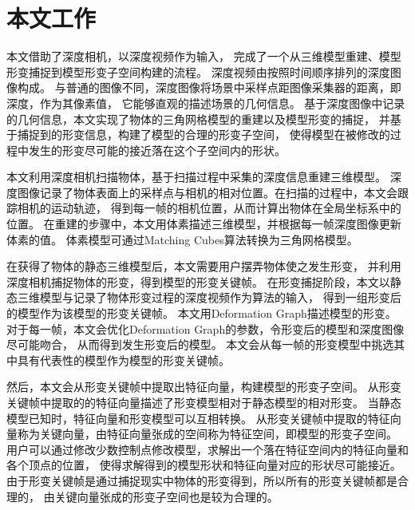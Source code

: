 
\section{本文工作}
本文借助了深度相机，以深度视频作为输入，
完成了一个从三维模型重建、模型形变捕捉到模型形变子空间构建的流程。
深度视频由按照时间顺序排列的深度图像构成。
与普通的图像不同，深度图像将场景中采样点距图像采集器的距离，即深度，作为其像素值，
它能够直观的描述场景的几何信息。
基于深度图像中记录的几何信息，本文实现了物体的三角网格模型的重建以及模型形变的捕捉，
并基于捕捉到的形变信息，构建了模型的合理的形变子空间，
使得模型在被修改的过程中发生的形变尽可能的接近落在这个子空间内的形状。

本文利用深度相机扫描物体，基于扫描过程中采集的深度信息重建三维模型。
深度图像记录了物体表面上的采样点与相机的相对位置。在扫描的过程中，本文会跟踪相机的运动轨迹，
得到每一帧的相机位置，从而计算出物体在全局坐标系中的位置。
在重建的步骤中，本文用体素描述三维模型，并根据每一帧深度图像更新体素的值。
体素模型可通过Matching Cubes\cite{lorensen1987marching}算法转换为三角网格模型。

在获得了物体的静态三维模型后，本文需要用户摆弄物体使之发生形变，
并利用深度相机捕捉物体的形变，得到模型的形变关键帧。
在形变捕捉阶段，本文以静态三维模型与记录了物体形变过程的深度视频作为算法的输入，
得到一组形变后的模型作为该模型的形变关键帧。
本文用Deformation Graph\cite{sumner2007embedded}描述模型的形变。
对于每一帧，本文会优化Deformation Graph的参数，令形变后的模型和深度图像尽可能吻合，
从而得到发生形变后的模型。
本文会从每一帧的形变模型中挑选其中具有代表性的模型作为模型的形变关键帧。

然后，本文会从形变关键帧中提取出特征向量，构建模型的形变子空间。
从形变关键帧中提取的的特征向量描述了形变模型相对于静态模型的相对形变。
当静态模型已知时，特征向量和形变模型可以互相转换。
从形变关键帧中提取的特征向量称为关键向量，由特征向量张成的空间称为特征空间，即模型的形变子空间。
用户可以通过修改少数控制点修改模型，求解出一个落在特征空间内的特征向量和各个顶点的位置，
使得求解得到的模型形状和特征向量对应的形状尽可能接近。
由于形变关键帧是通过捕捉现实中物体的形变得到，所以所有的形变关键帧都是合理的，
由关键向量张成的形变子空间也是较为合理的。

